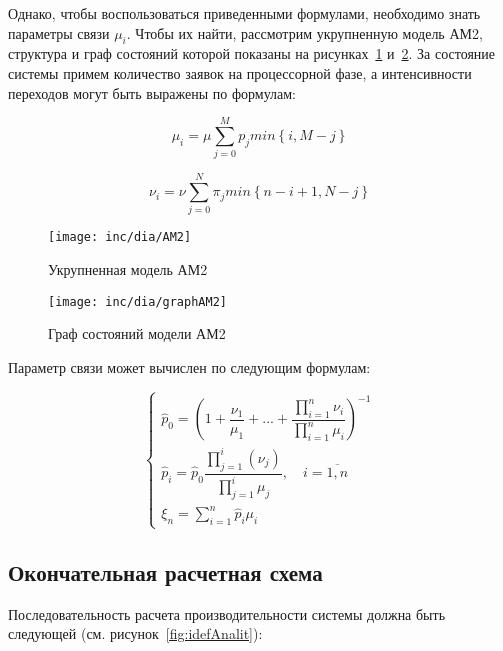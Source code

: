 Однако, чтобы воспользоваться приведенными формулами, необходимо знать параметры связи $\mu_i$. Чтобы их найти, рассмотрим укрупненную модель АМ2, структура и граф состояний которой показаны на рисунках~\ref{fig:AM2} и~\ref{fig:graphAM2}. За состояние системы примем количество заявок на процессорной фазе, а интенсивности переходов могут быть выражены по формулам:

\begin{equation}
\label{eq:mu}
\mu_i = \mu \sum \limits_{j=0}^M p_j min \left\lbrace i, M-j \right\rbrace
\end{equation}

\begin{equation}
\label{eq:nu}
\nu_i = \nu \sum \limits_{j=0}^N \pi_j min \left\lbrace n-i+1, N-j \right\rbrace
\end{equation}



\begin{figure}[ht]
\centering
\texttt{[image: inc/dia/AM2]}
\caption{Укрупненная модель АМ2}
\label{fig:AM2}
\end{figure}

\begin{figure}[ht]
\centering
\texttt{[image: inc/dia/graphAM2]}
\caption{Граф состояний модели АМ2}
\label{fig:graphAM2}
\end{figure}


Параметр связи может вычислен по следующим формулам:


\begin{equation}
\label{eq:AM2}
\left\{
   \begin{array}{lcl}
	\hat{p}_{0} = \left( 1 + \dfrac{\nu_1}{\mu_1} +  ... + \dfrac{\prod \limits_{i=1}^n \nu_i}{\prod \limits_{i=1}^n \mu_i} \right) ^{-1} \\
	\hat{p}_{i} = \hat{p}_{0} \dfrac{\prod \limits_{j=1}^{i} (\nu_j)}{\prod \limits_{j=1}^i \mu_{j}}, \quad i = \overline{1,n}  \\ 
	\xi_n = \sum \limits_{i=1}^n \hat{p}_i \mu_i
   \end{array}
\right.
\end{equation}


\subsection{Окончательная расчетная схема}
Последовательность расчета производительности системы должна быть следующей (см. рисунок~\ref{fig:idefAnalit}):

